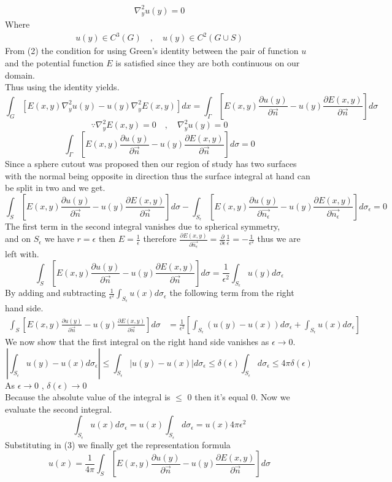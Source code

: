 \documentclass[]{article}
\begin{document}
\newpage
\begin{align}
\nabla_{y}^{2} u(y) =0
\end{align}
Where
\begin{align}
u(y) \in C^3(G) \quad,\quad u(y) \in C^2(G\cup S)
\end{align}
From (2) the condition for using Green's identity between the pair of function $u$ and the potential function $E$ is satisfied since they are both continuous on our domain. 
\\
Thus using the identity yields.
\[
    \int_G \left[E(x,y)\nabla_{y}^{2} u(y) - u(y)\nabla_{y}^{2} E(x,y)\right]dx = \int_\Gamma \left[E(x,y)\frac{\partial u(y)}{\partial \vec{n}}-u(y)\frac{\partial E(x,y)}{\partial \vec{n}}\right] d\sigma    
\]
\[
  \because \nabla_{y}^{2} E(x,y) = 0  \quad,\quad  \nabla_{y}^{2} u(y) =0
\]
\[
    \int_\Gamma \left[E(x,y)\frac{\partial u(y)}{\partial \vec{n}}-u(y)\frac{\partial E(x,y)}{\partial \vec{n}}\right] d\sigma = 0    
\]
Since a sphere cutout was proposed then our region of study has two surfaces with the normal being opposite in direction thus the surface integral at hand can be split in two and we get.
\[
    \int_S \left[E(x,y)\frac{\partial u(y)}{\partial \vec{n}}-u(y)\frac{\partial E(x,y)}{\partial \vec{n}}\right] d\sigma - \int_{S_\epsilon} \left[E(x,y)\frac{\partial u(y)}{\partial \vec{n_\epsilon}}-u(y)\frac{\partial E(x,y)}{\partial \vec{n_\epsilon}}\right] d\sigma_\epsilon  = 0    
\]
The first term in the second integral vanishes due to spherical symmetry, 
\\and on $S_\epsilon$ we have $r=\epsilon$ then $E = \frac{1}{\epsilon}$ therefore $\displaystyle \frac{\partial E(x,y)}{\partial \vec{n_\epsilon}} = \frac{\partial}{\partial \epsilon}\frac{1}{\epsilon} = -\frac{1}{\epsilon^2}$
thus we are left with.
\[
    \int_S \left[E(x,y)\frac{\partial u(y)}{\partial \vec{n}}-u(y)\frac{\partial E(x,y)}{\partial \vec{n}}\right] d\sigma  = \frac{1}{\epsilon^2} \int_{S_\epsilon} u(y) d\sigma_\epsilon    
\]
By adding and subtracting $\displaystyle \frac{1}{\epsilon^2} \int_{S_\epsilon} u(x) d\sigma_\epsilon$ the following term from the right hand side.
\begin{align}
\int_S \left[E(x,y)\frac{\partial u(y)}{\partial \vec{n}}-u(y)\frac{\partial E(x,y)}{\partial \vec{n}}\right] d\sigma  &= \frac{1}{\epsilon^2} \left[\int_{S_\epsilon} (u(y) - u(x)) d\sigma_\epsilon + \int_{S_\epsilon} u(x) d\sigma_\epsilon\right]
\end{align}
We now show that the first integral on the right hand side vanishes as $\epsilon \to 0$.
\[
    \left|\int_{S_\epsilon} u(y)-u(x) d\sigma_\epsilon \right| \leq \int_{S_\epsilon} |u(y)-u(x)| d\sigma_\epsilon \leq \delta(\epsilon)\int_{S_\epsilon} d\sigma_\epsilon \leq 4\pi \delta(\epsilon)    
\]
As $\epsilon \to 0$ , $\delta(\epsilon) \to 0$
\\
Because the absolute value of the integral is $\leq$ 0 then it's equal 0. Now we evaluate the second integral.
\[
    \int_{S_\epsilon} u(x)d\sigma_\epsilon = u(x)\int_{S_\epsilon}d\sigma_\epsilon = u(x) 4\pi\epsilon^2
\]
Substituting in (3) we finally get the representation formula
\[
    u(x) = \frac{1}{4\pi} \int_S \left[E(x,y)\frac{\partial u(y)}{\partial \vec{n}}-u(y)\frac{\partial E(x,y)}{\partial \vec{n}}\right] d\sigma    
\]
\newpage
\setcounter{equation}{0}
\end{document}
